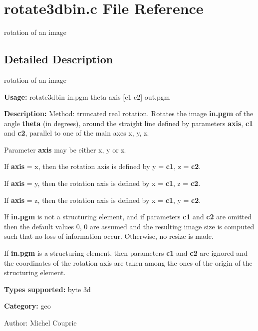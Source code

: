 \section{rotate3dbin.c File Reference}
\label{rotate3dbin_8c}
rotation of an image  




\label{_details}
\subsection{Detailed Description}
rotation of an image 

{\bf Usage:} rotate3dbin in.pgm theta axis [c1 c2] out.pgm

{\bf Description:} Method: truncated real rotation. Rotates the image {\bf in.pgm} of the angle {\bf theta} (in degrees), around the straight line defined by parameters {\bf axis}, {\bf c1} and {\bf c2}, parallel to one of the main axes x, y, z.\par
 Parameter {\bf axis} may be either x, y or z.\par
 If {\bf axis} = x, then the rotation axis is defined by y = {\bf c1}, z = {\bf c2}.\par
 If {\bf axis} = y, then the rotation axis is defined by x = {\bf c1}, z = {\bf c2}.\par
 If {\bf axis} = z, then the rotation axis is defined by x = {\bf c1}, y = {\bf c2}.\par


If {\bf in.pgm} is not a structuring element, and if parameters {\bf c1} and {\bf c2} are omitted then the default values 0, 0 are assumed and the resulting image size is computed such that no loss of information occur. Otherwise, no resize is made.

If {\bf in.pgm} is a structuring element, then parameters {\bf c1} and {\bf c2} are ignored and the coordinates of the rotation axis are taken among the ones of the origin of the structuring element.

{\bf Types supported:} byte 3d

{\bf Category:} geo

\begin{Desc}
\item[Author:]Michel Couprie \end{Desc}

